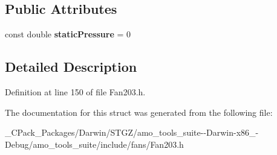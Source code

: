 \subsection*{Public Attributes}
\begin{DoxyCompactItemize}
\item 
\mbox{\label{struct_plane_data_1_1_node_binding_1_1_data_flange_a84b898bd8e199e2681324381aeb158d6}} 
const double {\bfseries static\+Pressure} = 0
\end{DoxyCompactItemize}


\subsection{Detailed Description}


Definition at line 150 of file Fan203.\+h.



The documentation for this struct was generated from the following file\+:\begin{DoxyCompactItemize}
\item 
\+\_\+\+C\+Pack\+\_\+\+Packages/\+Darwin/\+S\+T\+G\+Z/amo\+\_\+tools\+\_\+suite-\/-\/\+Darwin-\/x86\+\_-\/\+Debug/amo\+\_\+tools\+\_\+suite/include/fans/Fan203.\+h\end{DoxyCompactItemize}

